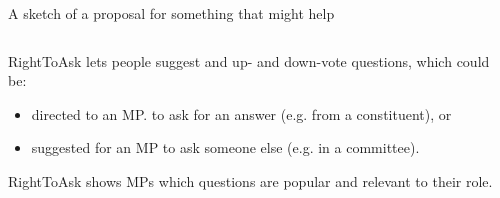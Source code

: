 \documentclass[10pt,xcolor=svgnames,169]{beamer} %
\begin{document}
	\begin{frame}[fragile]{A sketch of a proposal for something that might help}
	
	
	\begin{columns}
		\begin{column}{0.5\textwidth}
			
	RightToAsk lets people
	 suggest and up- and down-vote questions, which could be:
	
	\begin{itemize}
		\item directed to an MP.
		to ask for an answer (e.g. from a constituent), or
		\item suggested for an MP to ask someone else (e.g. in a committee).		
	\end{itemize}

	
	RightToAsk shows MPs which questions are popular and relevant to their role.
	

\end{column}
\end{columns}
\end{frame}
\end{document}
